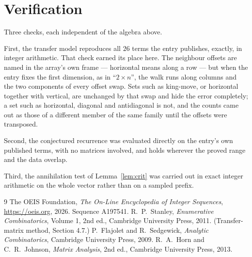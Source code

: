 \documentclass[11pt,a4paper]{article}
\theoremstyle{plain}
\theoremstyle{definition}
\begin{document}
\section{Verification}

Three checks, each independent of the algebra above.

First, the transfer model reproduces all $26$ terms the entry publishes, exactly, in
integer arithmetic. That check earned its place here. The neighbour offsets are named in the
array's own frame --- horizontal means along a row --- but when the entry fixes the first
dimension, as in ``$2\times n$'', the walk runs along columns and the two components of every
offset swap. Sets such as king-move, or horizontal together with vertical, are unchanged by
that swap and hide the error completely; a set such as horizontal, diagonal and antidiagonal
is not, and the counts came out as those of a different member of the same family until the
offsets were transposed.

Second, the conjectured recurrence was evaluated directly on the entry's own published terms,
with no matrices involved, and holds wherever the proved range and the data overlap.

Third, the annihilation test of Lemma~\ref{lem:crit} was carried out in exact integer
arithmetic on the whole vector rather than on a sampled prefix.

\begin{thebibliography}{9}
 The OEIS Foundation, \emph{The On-Line Encyclopedia of Integer
Sequences}, \url{https://oeis.org}, 2026. Sequence A197541.
 R.~P.~Stanley, \emph{Enumerative Combinatorics}, Volume 1, 2nd ed.,
Cambridge University Press, 2011. (Transfer-matrix method, Section 4.7.)
 P.~Flajolet and R.~Sedgewick, \emph{Analytic Combinatorics}, Cambridge
University Press, 2009.
 R.~A.~Horn and C.~R.~Johnson, \emph{Matrix Analysis}, 2nd ed., Cambridge
University Press, 2013.
\end{thebibliography}
\end{document}
